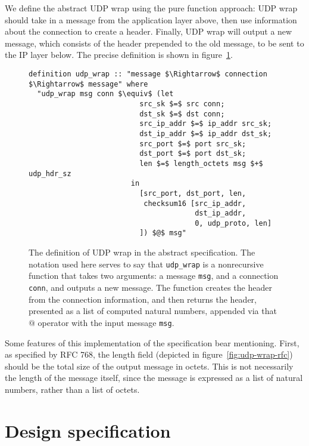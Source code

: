 \documentclass[twoside]{memoir}
\begin{document}
We define the abstract UDP wrap using the pure function approach:
UDP wrap should take in a message from the application layer above,
then use information about the connection to create a header.
Finally, UDP wrap will output a new message, which consists of the header
prepended to the old message, to be sent to the IP layer below.
The precise definition is shown in figure~\ref{fig:wrap-abstract}.

\begin{figure}[htpb]
    \centering
\begin{lstlisting}[language=isabelle]
definition udp_wrap :: "message $\Rightarrow$ connection $\Rightarrow$ message" where
  "udp_wrap msg conn $\equiv$ (let
                          src_sk $=$ src conn;
                          dst_sk $=$ dst conn;
                          src_ip_addr $=$ ip_addr src_sk;
                          dst_ip_addr $=$ ip_addr dst_sk;
                          src_port $=$ port src_sk;
                          dst_port $=$ port dst_sk;
                          len $=$ length_octets msg $+$ udp_hdr_sz
                        in
                          [src_port, dst_port, len,
                           checksum16 [src_ip_addr,
                                       dst_ip_addr,
                                       0, udp_proto, len]
                          ]) $@$ msg"
\end{lstlisting}
    \caption{The definition of UDP wrap in the abstract specification.
        The notation used here serves to say that \lstinline{udp_wrap}
        is a nonrecursive function that takes two arguments:
        a message \lstinline{msg}, and a connection \lstinline{conn},
        and outputs a new message.
        The function creates the header from the connection information,
        and then returns
        the header, presented as a list of computed natural numbers,
        appended via that $@$ operator with the input message
        \lstinline{msg}.
    }
    \label{fig:wrap-abstract}
\end{figure}

Some features of this implementation of the specification bear mentioning.
First, as specified by RFC 768, the length field (depicted in figure~\ref{fig:udp-wrap-rfc}) should be the total size of the output message in octets.
This is not necessarily the length of the message itself,
since the message is expressed as a list of natural numbers, rather than
a list of octets.



\section{Design specification}
\end{document}
